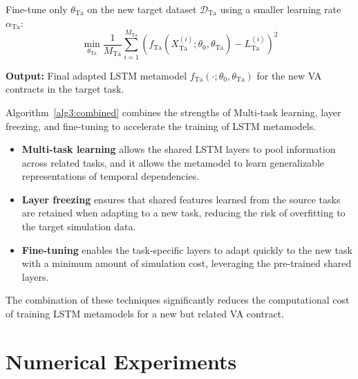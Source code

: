 \begin{algorithm}
\begin{algorithmic}[1]
        \STATE Fine-tune only $\theta_{\text{Ta}}$ on the new target dataset $\mathcal{D}_{\text{Ta}}$ using a smaller learning rate $\alpha_{\text{Ta}}$:
        \begin{equation}
            \min_{\theta_{\text{Ta}}} \frac{1}{M_{\text{Ta}}} \sum_{i=1}^{M_{\text{Ta}}} \left( f_{\text{Ta}}(X_{\text{Ta}}^{(i)}; \theta_0, \theta_{\text{Ta}}) - L_{\text{Ta}}^{(i)} \right)^2
        \end{equation}
        
        \STATE \textbf{Output:} Final adapted LSTM metamodel $f_{\text{Ta}}(\cdot; \theta_0, \theta_{\text{Ta}})$ for the new VA contracts in the target task.
    \end{algorithmic}
    \end{algorithm}

Algorithm~\ref{alg3:combined} combines the strengths of Multi-task learning, layer freezing, and fine-tuning to accelerate the training of LSTM metamodels. 

\begin{itemize}
    \item \textbf{Multi-task learning} allows the shared LSTM layers to pool information across related tasks, and it allows the metamodel to learn generalizable representations of temporal dependencies.
    \item \textbf{Layer freezing} ensures that shared features learned from the source tasks are retained when adapting to a new task, reducing the risk of overfitting to the target simulation data.
    \item \textbf{Fine-tuning} enables the task-specific layers to adapt quickly to the new task with a minimum amount of simulation cost, leveraging the pre-trained shared layers.

\end{itemize}
    
The combination of these techniques significantly reduces the computational cost of training LSTM metamodels for a new but related VA contract.

\section{Numerical Experiments} \label{sec3:experiments}

